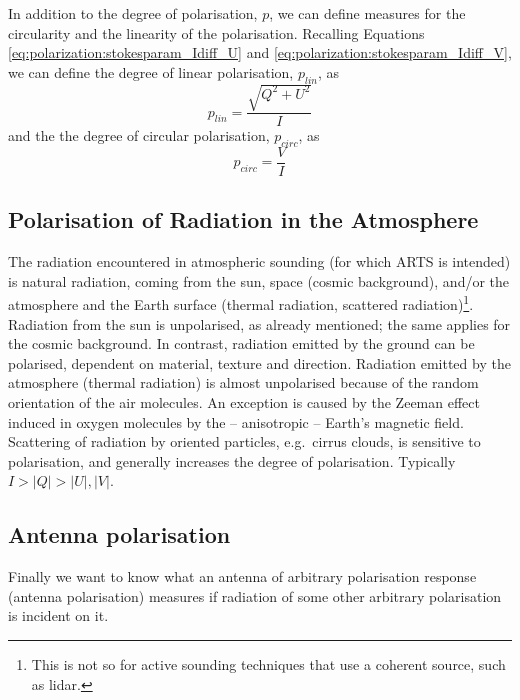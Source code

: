 In addition to the degree of polarisation, $p$, we can define measures
for the circularity and the linearity of the polarisation.
Recalling Equations \ref{eq:polarization:stokesparam_Idiff_U}
and \ref{eq:polarization:stokesparam_Idiff_V},
we can define the degree of linear polarisation, $p_{lin}$, as
\begin{equation}
  \label{eq:polarization:p_lin}
 p_{lin} = \frac{\sqrt{Q^2 + U^2}}{I} 
\end{equation}
and the the degree of circular polarisation, $p_{circ}$, as
\begin{equation}
  \label{eq:polarization:p_circ}
 p_{circ} = \frac{V}{I} 
\end{equation}


\subsection{Polarisation of Radiation in the Atmosphere}
\label{sec:polarization:atmosphere}
The radiation encountered in atmospheric sounding (for which ARTS is
intended) is natural radiation, coming from the sun, space (cosmic
background), and/or the atmosphere and the Earth surface (thermal
radiation, scattered radiation)\footnote{This is not so for active
  sounding techniques that use a coherent source, such as lidar.}.
Radiation from the sun is unpolarised, as already mentioned; the same
applies for the cosmic background.  In contrast,
radiation emitted by the ground can be polarised, dependent on
material, texture and direction.  Radiation emitted by the atmosphere
(thermal radiation) is almost unpolarised because of the random
orientation of the air molecules.  An exception is caused by the
Zeeman effect induced in oxygen molecules by the -- anisotropic --
Earth's magnetic field.  Scattering of radiation by oriented
particles, e.g.\ cirrus clouds, is sensitive to polarisation, and
generally increases the degree of polarisation.  Typically $I > |Q| >
|U|,|V|$.


\subsection{Antenna polarisation}
\label{sec:polarization:antenna}
Finally we want to know what an antenna of arbitrary polarisation
response (antenna polarisation)
measures if radiation of some other arbitrary polarisation is incident
on it.

